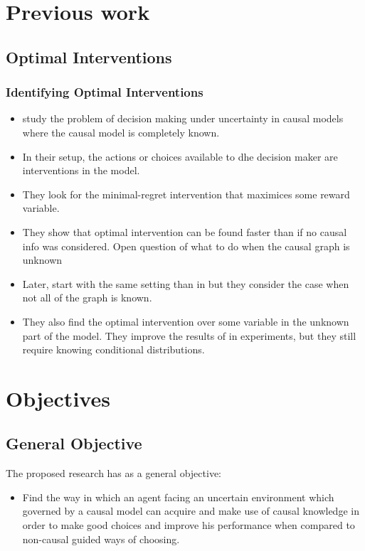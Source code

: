 \documentclass{beamer}
\theoremstyle{plain}
\begin{document}
\section{Previous work}
	\subsection{Optimal Interventions}
	\begin{frame}[allowframebreaks]
	\frametitle{Identifying Optimal Interventions}
	\begin{itemize}
		\item \cite{lattimoreNIPS2016} study the problem of decision making under uncertainty in causal models where the causal model is completely known.
		\item In their setup, the actions or choices available to dhe decision maker are interventions in the model.
		\item They look for the minimal-regret intervention that maximices some reward variable. 
		\item They show that optimal intervention can be found faster than if no causal info was considered. Open question of what to do when the causal graph is unknown
		\item Later, \cite{sen2017identifying} start with the same setting than in \cite{lattimoreNIPS2016} but they consider the case when not all of the graph is known. 
		\item They also find the optimal intervention over some variable in the unknown part of the model. They improve the results of \cite{lattimoreNIPS2016} in experiments, but they still require knowing conditional distributions.
	\end{itemize}
\end{frame}

\section{Objectives}
	\subsection{General Objective}
	\begin{frame}
	The proposed research has as a general objective: 
	\begin{itemize}
	\item Find the way in which an agent facing an uncertain environment which governed by a causal model can acquire and make use of causal knowledge in order to make good choices and improve his performance when compared to non-causal guided ways of choosing.
	\end{itemize}
	\end{frame}
\end{document}

